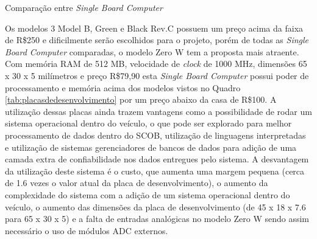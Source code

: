 \begin{table}[!htb]
	\centering
	\caption{Comparação entre \textit{Single Board Computer}}
	\label{tab:singleboard}
	\caption*{Fonte: Autor.}
\end{table}

Os modelos 3 Model B, Green e Black Rev.C possuem um preço acima da faixa de R\$250 e dificilmente serão escolhidos para o projeto, porém de todas as \textit{Single Board Computer} comparadas, o modelo Zero W tem a proposta mais atraente. Com memória RAM de 512 MB, velocidade de \textit{clock} de 1000 MHz, dimensões 65 x 30 x 5 milímetros e preço R\$79,90 esta \textit{Single Board Computer} possui poder de processamento e memória acima dos modelos vistos no Quadro \ref{tab:placasdedesenvolvimento} por um preço abaixo da casa de R\$100. A utilização dessas placas ainda trazem vantagens como a possibilidade de rodar um sistema operacional dentro do veículo, o que pode ser explorado para melhor processamento de dados dentro do SCOB, utilização de linguagens interpretadas e utilização de sistemas gerenciadores de bancos de dados para adição de uma camada extra de confiabilidade nos dados entregues pelo sistema. A desvantagem da utilização deste sistema é o custo, que aumenta uma margem pequena (cerca de 1.6 vezes o valor atual da placa de desenvolvimento), o aumento da complexidade do sistema com a adição de um sistema operacional dentro do veículo, o aumento das dimensões da placa de desenvolvimento (de 45 x 18 x 7.6 para 65 x 30 x 5) e a falta de entradas analógicas no modelo Zero W sendo assim necessário o uso de módulos ADC externos. 


